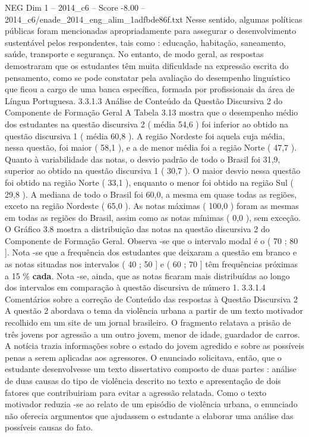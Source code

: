\begin{textsample}{NEG Dim 1 – 2014\_c6 – Score -8.00 – 2014\_c6/enade\_2014\_eng\_alim\_1adfbde86f.txt}
Nesse sentido, algumas políticas públicas foram mencionadas apropriadamente para assegurar o desenvolvimento sustentável pelos respondentes, tais como : educação, habitação, saneamento, saúde, transporte e segurança.
No entanto, de modo geral, as respostas demostraram que os estudantes têm muita dificuldade na expressão escrita do pensamento, como se pode constatar pela avaliação do desempenho linguístico que ficou a cargo de uma banca específica, formada por profissionais da área de Língua Portuguesa. 3.3.1.3 Análise de Conteúdo da Questão Discursiva 2 do Componente de Formação Geral A Tabela 3.13 mostra que o desempenho médio dos estudantes na questão discursiva 2 ( média 54,6 ) foi inferior ao obtido na questão discursiva 1 ( média 60,8 ).
A região Nordeste foi aquela cuja média, nessa questão, foi maior ( 58,1 ), e a de menor média foi a região Norte ( 47,7 ).
Quanto à variabilidade das notas, o desvio padrão de todo o Brasil foi 31,9, superior ao obtido na questão discursiva 1 ( 30,7 ).
O maior desvio nessa questão foi obtido na região Norte ( 33,1 ), enquanto o menor foi obtido na região Sul ( 29,8 ).
A mediana de todo o Brasil foi 60,0, a mesma em quase todas as regiões, exceto na região Nordeste ( 65,0 ).
As notas máximas ( 100,0 ) foram as mesmas em todas as regiões do Brasil, assim como as notas mínimas ( 0,0 ), sem exceção.
O Gráfico 3.8 mostra a distribuição das notas na questão discursiva 2 do Componente de Formação Geral.
Observa -se que o intervalo modal é o ( 70 ; 80 ].
Nota -se que a frequência dos estudantes que deixaram a questão em branco e as notas situadas nos intervalos ( 40 ; 50 ] e ( 60 ; 70 ] têm frequências próximas a 15 \% \textbf{cada}.
Nota -se, ainda, que as notas ficaram mais distribuídas ao longo dos intervalos em comparação à questão discursiva de número 1. 3.3.1.4 Comentários sobre a correção de Conteúdo das respostas à Questão Discursiva 2 A questão 2 abordava o tema da violência urbana a partir de um texto motivador recolhido em um site de um jornal brasileiro.
O fragmento relatava a prisão de três jovens por agressão a um outro jovem, menor de idade, guardador de carros.
A notícia trazia informações sobre o estado do jovem agredido e sobre as possíveis penas a serem aplicadas aos agressores.
O enunciado solicitava, então, que o estudante desenvolvesse um texto dissertativo composto de duas partes : análise de duas causas do tipo de violência descrito no texto e apresentação de dois fatores que contribuiriam para evitar a agressão relatada.
Como o texto motivador reduzia -se ao relato de um episódio de violência urbana, o enunciado não oferecia argumentos que ajudassem o estudante a elaborar uma análise das possíveis causas do fato.

\end{textsample}
